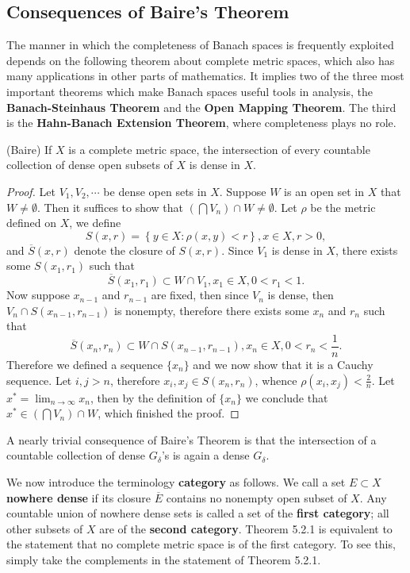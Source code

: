 \subsection{Consequences of Baire's Theorem}
The manner in which the completeness of Banach spaces is frequently exploited depends on the following theorem about complete metric spaces, which also has many applications in other parts of mathematics. It implies two of the three most important theorems which make Banach spaces useful tools in analysis, the \textbf{Banach-Steinhaus Theorem} and the \textbf{Open Mapping Theorem}. The third is the \textbf{Hahn-Banach Extension Theorem}, where completeness plays no role.
\begin{theorem}(Baire)
If $X$ is a complete metric space, the intersection of every countable collection of dense open subsets of $X$ is dense in $X$.
\end{theorem}
\begin{proof}
Let $V_1,V_2,\cdots$ be dense open sets in $X$. Suppose $W$ is an open set in $X$ that $W\ne\emptyset$. Then it suffices to show that $\left(\bigcap V_n\right)\cap W\ne\emptyset$. Let $\rho$ be the metric defined on $X$, we define 
$$
S\left( x,r \right) =\left\{ y\in X:\rho \left( x,y \right) <r \right\} ,x\in X,r>0,
$$
and $\overline{S}(x,r)$ denote the closure of $S(x,r)$. Since $V_1$ is dense in $X$, there exists some $S(x_1,r_1)$ such that 
$$
\overline{S}\left( x_1,r_1 \right) \subset W\cap V_1,x_1\in X,0<r_1<1.
$$
Now suppose $x_{n-1}$ and $r_{n-1}$ are fixed, then since $V_n$ is dense, then $V_n\cap S(x_{n-1},r_{n-1})$ is nonempty, therefore there exists some $x_n$ and $r_n$ such that 
$$
\overline{S}\left( x_n,r_n \right) \subset W\cap S\left( x_{n-1},r_{n-1} \right) ,x_n\in X,0<r_n<\frac{1}{n}.
$$
Therefore we defined a sequence $\{x_n\}$ and we now show that it is a Cauchy sequence. Let $i,j>n$, therefore $x_i,x_j\in S(x_n,r_n)$, whence $\rho(x_i,x_j)<\frac{2}{n}$. Let $x^*=\lim_{n\to\infty}x_n$, then by the definition of $\{x_n\}$ we conclude that $x^*\in\left(\bigcap V_n\right)\cap W$, which finished the proof.
\end{proof}
A nearly trivial consequence of Baire's Theorem is that the intersection of a countable collection of dense $G_\delta$'s is again a dense $G_\delta$.\par
We now introduce the terminology \textbf{category} as follows. We call a set $E\subset X$ \textbf{nowhere dense} if its closure $\overline{E}$ contains no nonempty open subset of $X$. Any countable union of nowhere dense sets is called a set of the \textbf{first category}; all other subsets of $X$ are of the \textbf{second category}. Theorem 5.2.1 is equivalent to the statement that no complete metric space is of the first category. To see this, simply take the complements in the statement of Theorem 5.2.1.\par
